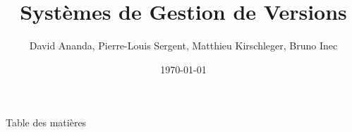 \documentclass{beamer}
\title{Systèmes de Gestion de Versions}
\date{\today}
\author{David Ananda, Pierre-Louis Sergent, Matthieu Kirschleger, Bruno Inec}
\institute{IUT informatique Lyon1}
\begin{document}
  \maketitle

  \begin{frame}{Table des matières}
    \tableofcontents
  \end{frame}

  
  
  
\end{document}
